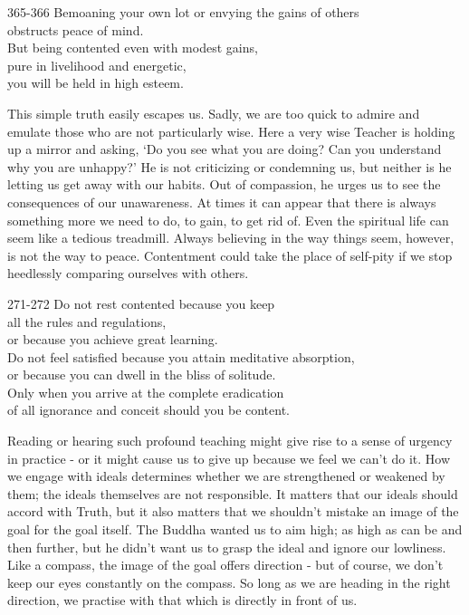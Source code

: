 
\begin{dhpVerse}{365-366}
\label{dhp-365}\label{dhp-366}
Bemoaning your own lot or envying the gains of others\\
obstructs peace of mind.\\
But being contented even with modest gains,\\
pure in livelihood and energetic,\\
you will be held in high esteem. 
\end{dhpVerse}

\begin{dhpRefl}
  This simple truth easily escapes us. Sadly, we are too quick to admire and
  emulate those who are not particularly wise. Here a very wise Teacher is
  holding up a mirror and asking, ‘Do you see what you are doing? Can you
  understand why you are unhappy?’ He is not criticizing or condemning us, but
  neither is he letting us get away with our habits. Out of compassion, he urges
  us to see the consequences of our unawareness. At times it can appear that
  there is always something more we need to do, to gain, to get rid of. Even the
  spiritual life can seem like a tedious treadmill. Always believing in the way
  things seem, however, is not the way to peace. Contentment could take the
  place of self-pity if we stop heedlessly comparing ourselves with others.
\end{dhpRefl}


\begin{dhpVerse}{271-272}
\label{dhp-271}\label{dhp-272}
Do not rest contented because you keep\\
all the rules and regulations,\\
or because you achieve great learning.\\
Do not feel satisfied because you attain meditative absorption,\\
or because you can dwell in the bliss of solitude.\\
Only when you arrive at the complete eradication\\
of all ignorance and conceit should you be content.
\end{dhpVerse}

\begin{dhpRefl}
  Reading or hearing such profound teaching might give rise to a sense of
  urgency in practice - or it might cause us to give up because we feel we can’t
  do it. How we engage with ideals determines whether we are strengthened or
  weakened by them; the ideals themselves are not responsible. It matters that
  our ideals should accord with Truth, but it also matters that we shouldn't
  mistake an image of the goal for the goal itself. The Buddha wanted us to aim
  high; as high as can be and then further, but he didn’t want us to grasp the
  ideal and ignore our lowliness. Like a compass, the image of the goal offers
  direction - but of course, we don’t keep our eyes constantly on the compass.
  So long as we are heading in the right direction, we practise with that which
  is directly in front of us.
\end{dhpRefl}

